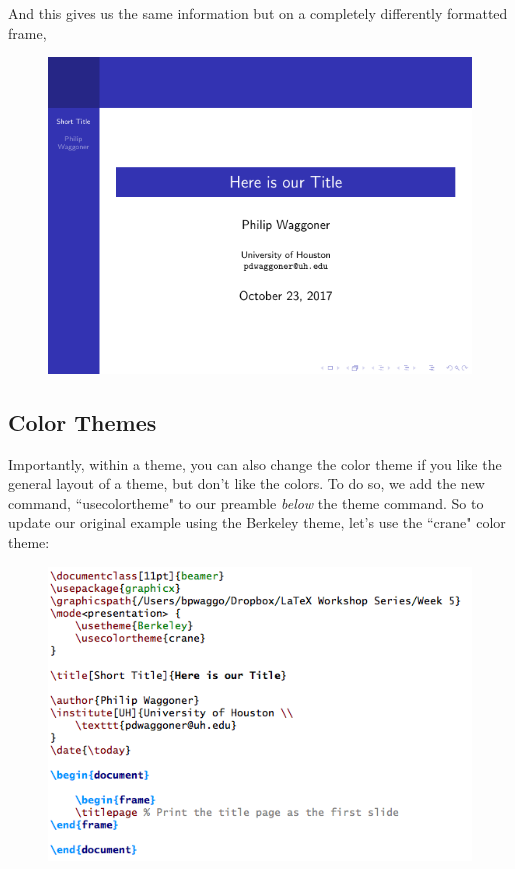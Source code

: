 \documentclass[11pt]{article}
\newcommand{\forceindent}{\leavevmode{\parindent=1.5em\indent}} %
\begin{document}
And this gives us the same information but on a completely differently formatted frame,

\begin{figure}[!h]
	\includegraphics[scale=.5]{OUT3}
	\centering
\end{figure}

\newpage

\subsection{Color Themes}

\forceindent Importantly, within a theme, you can also change the color theme if you like the general layout of a theme, but don't like the colors. To do so, we add the new command, ``usecolortheme" to our preamble \textit{below} the theme command. So to update our original example using the Berkeley theme, let's use the ``crane" color theme:

\begin{figure}[!h]
	\includegraphics[scale=.5]{CODE4}
	\centering
\end{figure}
\end{document}

